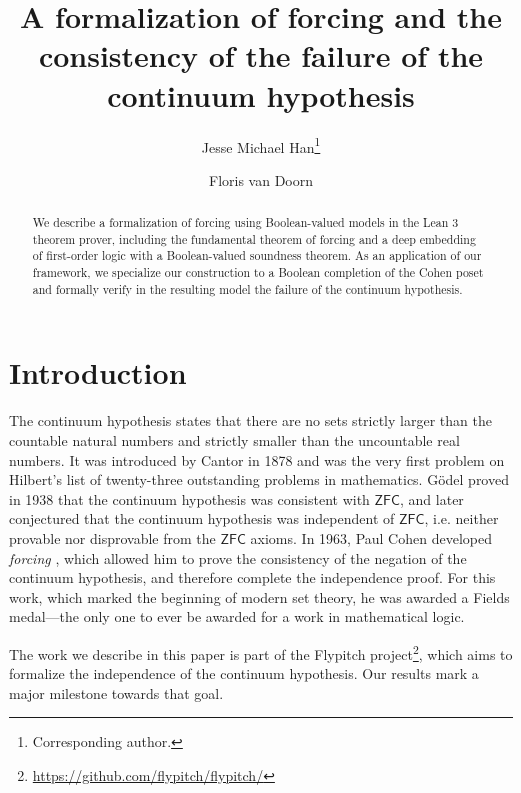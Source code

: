 \documentclass[a4paper,USenglish,cleveref, autoref]{lipics-v2019}
\title{A formalization of forcing and the consistency of the failure of the continuum hypothesis} %
\author{Jesse Michael Han\footnote{Corresponding author.}}{Department of Mathematics, University of Pittsburgh \and \url{https://www.pitt.edu/~jmh288}}{jessemichaelhan@gmail.com}{}{}%
\author{Floris van Doorn}{Department of Mathematics, University of Pittsburgh}{}{}{}
\begin{document}
\maketitle

\begin{abstract}
We describe a formalization of forcing using Boolean-valued models in the Lean 3 theorem prover, including the fundamental theorem of forcing and a deep embedding of first-order logic with a Boolean-valued soundness theorem. As an application of our framework, we specialize our construction to a Boolean completion of the Cohen poset and formally verify in the resulting model the failure of the continuum hypothesis.
\end{abstract}

\section*{Introduction}
The continuum hypothesis states that there are no sets strictly larger than the countable natural numbers and strictly smaller than the uncountable real numbers. It was introduced by Cantor in 1878 and was the very first problem on Hilbert's list of twenty-three outstanding problems in mathematics. G\"odel proved in 1938 \cite{godel1938consistency} that the continuum hypothesis was consistent with $\mathsf{ZFC}$, and later conjectured that the continuum hypothesis was independent of $\mathsf{ZFC}$, i.e. neither provable nor disprovable from the $\mathsf{ZFC}$ axioms. In 1963, Paul Cohen developed \emph{forcing} \cite{cohen-the-independence-of-the-continuum-hypothesis-1}, which allowed him to prove the consistency of the negation of the continuum hypothesis, and therefore complete the independence proof. For this work, which marked the beginning of modern set theory, he was awarded a Fields medal---the only one to ever be awarded for a work in mathematical logic.

The work we describe in this paper is part of the Flypitch project\footnote{\url{https://github.com/flypitch/flypitch/}}, which aims to formalize the independence of the continuum hypothesis. Our results mark a major milestone towards that goal.
\end{document}
